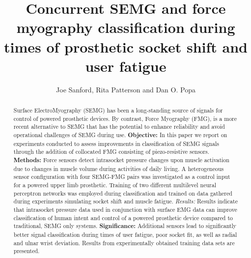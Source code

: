 \documentclass[twocolumn]{sagej}
\begin{document}
%


\title{Concurrent SEMG and force myography classification during times of prosthetic socket shift and user fatigue}

\author{Joe Sanford, Rita Patterson and Dan O. Popa}




\begin{abstract}
Surface ElectroMyography (SEMG) has been a long-standing source of signals for control of powered prosthetic devices. By contrast, Force Myography (FMG),  is a more recent alternative to SEMG that has the potential to enhance reliability and avoid operational challenges of SEMG during use. \textbf{Objective:} In this paper we report on experiments  conducted to assess improvements in classification of SEMG signals through  the addition of  collocated  FMG consisting of piezo-resistive  sensors. \textbf{Methods:} Force  sensors detect intrasocket pressure changes upon muscle activation  due to changes in muscle volume during activities of daily living. A heterogeneous sensor configuration  with four SEMG-FMG pairs was investigated as a control input for a powered upper limb prosthetic. Training of two different multilevel neural perceptron networks was employed during classification and trained on data  gathered during experiments simulating socket shift and muscle fatigue. \textit{Results:} Results indicate that intrasocket  pressure data used in conjunction with surface EMG data can improve classification of human intent and control of a powered prosthetic device compared to traditional, SEMG only systems. \textbf{Significance:} Additional sensors lead to significantly better signal classification during times of user fatigue, poor socket fit, as well as radial and ulnar wrist deviation.  Results from experimentally obtained training data sets are presented.
\end{abstract}
\end{document}
